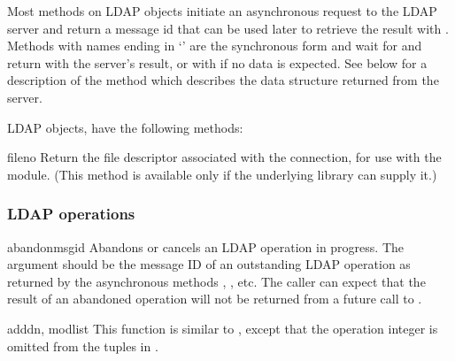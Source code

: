 Most methods on LDAP objects
initiate an asynchronous request to the LDAP server 
and return a message id that can be used later to retrieve the result
with . 
Methods with names ending in `' are the synchronous form 
and wait for and return with the server's result, or with
 if no data is expected.
See below for a description of the  method 
which describes the data structure returned from the server.

LDAP objects, have the following methods:


\begin{methoddesc}{fileno}{}
Return the file descriptor associated with the connection, for use
with the  module.
(This method is available only if the underlying library can supply it.)
\end{methoddesc}

\subsubsection{LDAP operations}


\begin{methoddesc}[LDAP]{abandon}{msgid}
Abandons or cancels an LDAP operation in progress. The  argument
should be the message ID of an outstanding LDAP operation as returned by
the asynchronous methods , , etc. 
The caller can expect that the result
of an abandoned operation will not be returned from a future call to 
.
\end{methoddesc}


\begin{methoddesc}[LDAP]{add}{dn, modlist} %
This function is similar to , except that the operation
integer is omitted from the tuples in .
\end{methoddesc}



